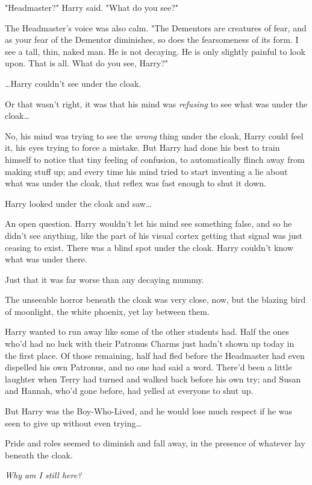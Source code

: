"Headmaster?" Harry said. "What do you see?"

The Headmaster's voice was also calm. "The Dementors are creatures of fear, and
as your fear of the Dementor diminishes, so does the fearsomeness of its form.
I see a tall, thin, naked man. He is not decaying. He is only slightly painful
to look upon. That is all. What do you see, Harry?"

{\ldots}Harry couldn't see under the cloak.

Or that wasn't right, it was that his mind was \emph{refusing} to see what was
under the cloak{\ldots}

No, his mind was trying to see the \emph{wrong} thing under the cloak, Harry
could feel it, his eyes trying to force a mistake. But Harry had done his best
to train himself to notice that tiny feeling of confusion, to automatically
flinch away from making stuff up; and every time his mind tried to start
inventing a lie about what was under the cloak, that reflex was fast enough to
shut it down.

Harry looked under the cloak and saw{\ldots}

An open question. Harry wouldn't let his mind see something false, and so he
didn't see anything, like the part of his visual cortex getting that signal was
just ceasing to exist. There was a blind spot under the cloak. Harry couldn't
know what was under there.

Just that it was far worse than any decaying mummy.

The unseeable horror beneath the cloak was very close, now, but the blazing
bird of moonlight, the white phoenix, yet lay between them.

Harry wanted to run away like some of the other students had. Half the ones
who'd had no luck with their Patronus Charms just hadn't shown up today in the
first place. Of those remaining, half had fled before the Headmaster had even
dispelled his own Patronus, and no one had said a word. There'd been a little
laughter when Terry had turned and walked back before his own try; and Susan
and Hannah, who'd gone before, had yelled at everyone to shut up.

But Harry was the Boy-Who-Lived, and he would lose much respect if he was seen
to give up without even trying{\ldots}

Pride and roles seemed to diminish and fall away, in the presence of whatever
lay beneath the cloak.

\emph{Why am I still here?}

